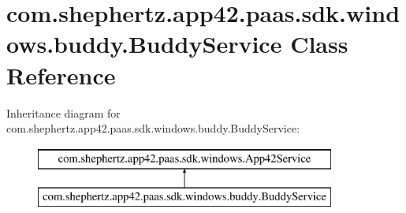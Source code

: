 \hypertarget{classcom_1_1shephertz_1_1app42_1_1paas_1_1sdk_1_1windows_1_1buddy_1_1_buddy_service}{\section{com.\+shephertz.\+app42.\+paas.\+sdk.\+windows.\+buddy.\+Buddy\+Service Class Reference}
\label{classcom_1_1shephertz_1_1app42_1_1paas_1_1sdk_1_1windows_1_1buddy_1_1_buddy_service}
}
Inheritance diagram for com.\+shephertz.\+app42.\+paas.\+sdk.\+windows.\+buddy.\+Buddy\+Service\+:\begin{figure}[H]
\begin{center}
\leavevmode
\includegraphics[height=2.000000cm]{classcom_1_1shephertz_1_1app42_1_1paas_1_1sdk_1_1windows_1_1buddy_1_1_buddy_service}
\end{center}
\end{figure}
